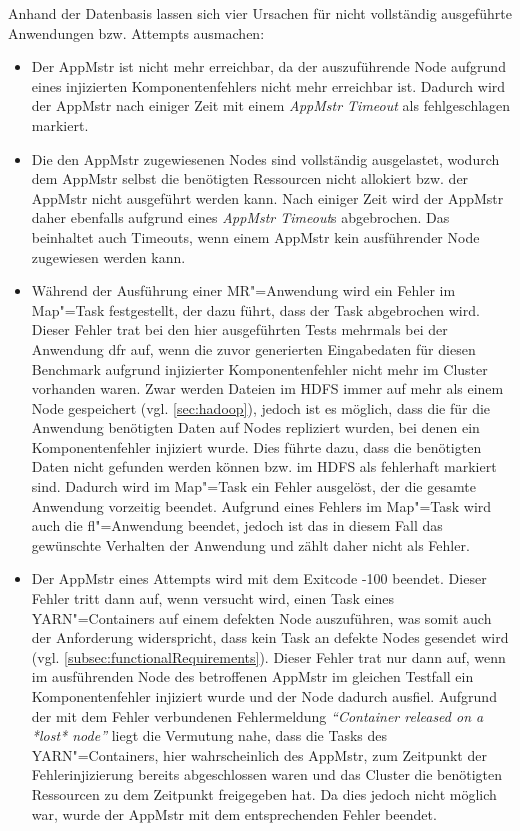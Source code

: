 Anhand der Datenbasis lassen sich vier Ursachen für nicht vollständig ausgeführte Anwendungen bzw. Attempts ausmachen:

\begin{itemize}
    \item
        Der \gls{AppMstr} ist nicht mehr erreichbar, da der auszuführende Node aufgrund eines injizierten Komponentenfehlers nicht mehr erreichbar ist.
        Dadurch wird der \gls{AppMstr} nach einiger Zeit mit einem \emph{\gls{AppMstr} Timeout} als fehlgeschlagen markiert.
    \item
        Die den \gls{AppMstr} zugewiesenen Nodes sind vollständig ausgelastet, wodurch dem \gls{AppMstr} selbst die benötigten Ressourcen nicht allokiert bzw. der \gls{AppMstr} nicht ausgeführt werden kann.
        Nach einiger Zeit wird der \gls{AppMstr} daher ebenfalls aufgrund eines \emph{\gls{AppMstr} Timeout}s abgebrochen.
        Das beinhaltet auch Timeouts, wenn einem \gls{AppMstr} kein ausführender Node zugewiesen werden kann.
    \item
        Während der Ausführung einer \gls{MR}"=Anwendung wird ein Fehler im Map"=Task festgestellt, der dazu führt, dass der Task abgebrochen wird.
        Dieser Fehler trat bei den hier ausgeführten Tests mehrmals bei der Anwendung \acrlong{dfr} auf, wenn die zuvor generierten Eingabedaten für diesen Benchmark aufgrund injizierter Komponentenfehler nicht mehr im Cluster vorhanden waren.
        Zwar werden Dateien im HDFS immer auf mehr als einem Node gespeichert (vgl. \cref{sec:hadoop}), jedoch ist es möglich, dass die für die Anwendung benötigten Daten auf Nodes repliziert wurden, bei denen ein Komponentenfehler injiziert wurde.
        Dies führte dazu, dass die benötigten Daten nicht gefunden werden können bzw. im HDFS als fehlerhaft markiert sind.
        Dadurch wird im Map"=Task ein Fehler ausgelöst, der die gesamte Anwendung vorzeitig beendet.
        Aufgrund eines Fehlers im Map"=Task wird auch die \acrlong{fl}"=Anwendung beendet, jedoch ist das in diesem Fall das gewünschte Verhalten der Anwendung und zählt daher nicht als Fehler.
    \item
        Der \gls{AppMstr} eines Attempts wird mit dem Exitcode -100 beendet.
        Dieser Fehler tritt dann auf, wenn versucht wird, einen Task eines YARN"=Containers auf einem defekten Node auszuführen, was somit auch der Anforderung widerspricht, dass kein Task an defekte Nodes gesendet wird (vgl. \cref{subsec:functionalRequirements}).
        Dieser Fehler trat nur dann auf, wenn im ausführenden Node des betroffenen \gls{AppMstr} im gleichen Testfall ein Komponentenfehler injiziert wurde und der Node dadurch ausfiel.
        Aufgrund der mit dem Fehler verbundenen Fehlermeldung \emph{\enquote{Container released on a *lost* node}} liegt die Vermutung nahe, dass die Tasks des YARN"=Containers, hier wahrscheinlich des \gls{AppMstr}, zum Zeitpunkt der Fehlerinjizierung bereits abgeschlossen waren und das Cluster die benötigten Ressourcen zu dem Zeitpunkt freigegeben hat.
        Da dies jedoch nicht möglich war, wurde der \gls{AppMstr} mit dem entsprechenden Fehler beendet.
\end{itemize}

